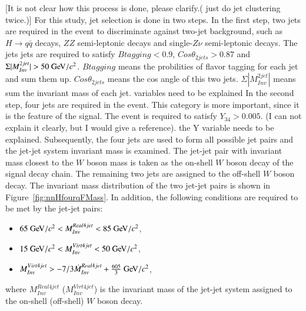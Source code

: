 \documentclass[11pt,a4paper]{cepcnote}
\begin{document}
{\color{red}[It is not clear how this process is done, please clarify.(\color{blue} just do jet clustering twice.)]}
For this study, jet selection is done in two steps. In the first step,
two jets are required in the event to discriminate against 
two-jet background, such as $H\rightarrow q\bar{q}$ decays, 
$ZZ$ semi-leptonic decays and single-$Z\nu$ semi-leptonic decays. 
The jets jets are required to satisfy $Btagging < 0.9$, 
$Cos\theta_{2jets} > 0.87$ and $\Sigma|M_{Inv}^{2jet}| > 50\gev/c^2$. 
{\color{blue} $Btagging$ means the probilities of flavor tagging for each jet and sum them up. 
$Cos\theta_{2jets} $ means the cos angle of this two jets.
$\Sigma|M_{Inv}^{2jet}|$ means sum the invariant mass of each jet.}
{\color{red} variables need to be explained}
In the second step, four jets are required in the event. This category
is more important, since it is the feature of the signal. 
The event is required to satisfy  $Y_{34} > 0.005$. {\color{blue}(I can not explain it clearly, but I would give a reference).}
{\color{red} the Y variable needs to be explained}.
Subsequently, the four jets are used to form all possible jet pairs and the
jet-jet system invariant mass is examined. The jet-jet pair with invariant
 mass closest to the $W$ boson mass is taken as the on-shell $W$ boson decay
of the signal decay chain. The remaining two jets are assigned to the
off-shell $W$ boson decay. The invariant mass distribution of the two
jet-jet pairs is shown in Figure~\ref{fig:nnHfourqFMass}.
In addition, the following conditions are required to be met by the jet-jet pairs:
\begin{itemize}
	\item $ 65\gev/c^2 < M_{Inv}^{Real4jet} < 85\gev/c^2$, 
	\item $ 15\gev/c^2 < M_{Inv}^{Virt4jet} < 50\gev/c^2$, 
	\item $ M_{Inv}^{Virt4jet} > -7/3\dot M_{Inv}^{Real4jet} + \frac{605}{3}\gev/c^2$,
\end{itemize}
where $M_{Inv}^{Real4jet}$  ($M_{Inv}^{Virt4jet}$) is the invariant mass of the jet-jet system assigned to the on-shell (off-shell) $W$ boson decay.
\end{document}
